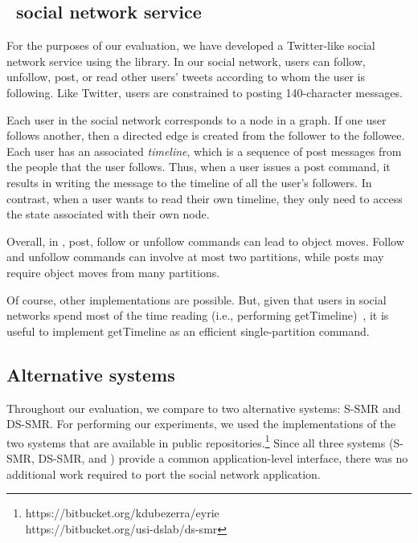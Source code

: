 \subsection{\appname\ social network service}
\label{sec:imp:\appname}

For the purposes of our evaluation, we have developed a Twitter-like
social network service using the \dynastar{} library.  In our social
network, users can follow, unfollow, post, or read other users' tweets
according to whom the user is following. Like Twitter, users are
constrained to posting 140-character messages.

Each user in the social network corresponds to a node in a graph. If
one user follows another, then a directed edge is created from the
follower to the followee. Each user has an associated \emph{timeline},
which is a sequence of post messages from the people that the user
follows. Thus, when a user issues a post command, it results in
writing the message to the timeline of all the user's followers.  In
contrast, when a user wants to read their own timeline, they only need
to access the state associated with their own node.

Overall, in \appname, post, follow or unfollow commands can lead to
object moves.  Follow and unfollow commands can involve at most two
partitions, while posts may require object moves from many partitions.

Of course, other implementations are possible. But, given that users
in social networks spend most of the time reading (i.e., performing
getTimeline)~\cite{facebookTAO}, it is useful to implement getTimeline
as an efficient single-partition command.


\subsection{Alternative systems}

Throughout our evaluation, we compare \dynastar{} to two alternative
systems: S-SMR and DS-SMR. For performing our experiments, we used the
implementations of the two systems that are available in public
repositories.\footnote{https://bitbucket.org/kdubezerra/eyrie\\ \mbox{\hspace{5mm}https://bitbucket.org/usi-dslab/ds-smr}} Since
all three systems (S-SMR, DS-SMR, and \dynastar) provide a common
application-level interface, there was no additional work required to
port the social network application.

